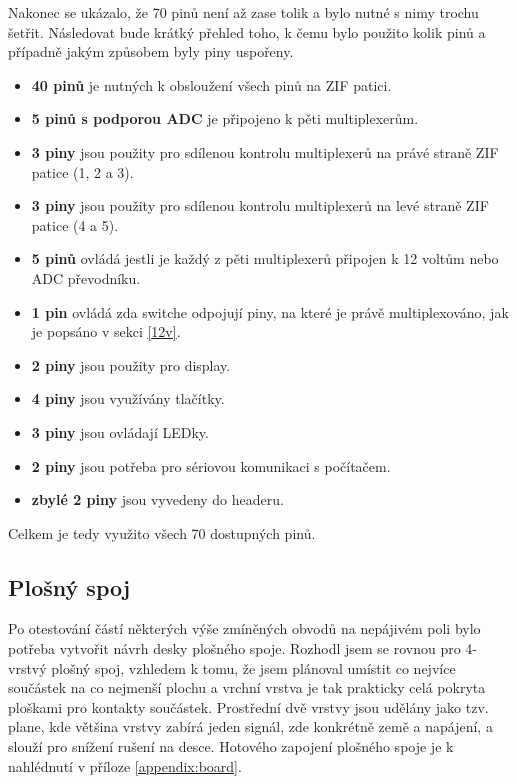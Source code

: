 \documentclass[11pt,a4paper,twoside,openright]{report}
\begin{document}
Nakonec se ukázalo, že 70 pinů není až zase tolik a bylo nutné s nimy trochu šetřit. Následovat bude krátký přehled toho, k čemu bylo použito kolik pinů a případně jakým způsobem byly piny uspořeny.

\begin {itemize}
\item \textbf{40 pinů} je nutných k obsloužení všech pinů na ZIF patici.
\item \textbf{5 pinů s podporou ADC} je připojeno k pěti multiplexerům.
\item \textbf{3 piny} jsou použity pro sdílenou kontrolu multiplexerů na právé straně ZIF patice (1, 2 a 3). \footnotemark{}
\item \textbf{3 piny} jsou použity pro sdílenou kontrolu multiplexerů na levé straně ZIF patice (4 a 5). \footnotemark[\value{footnote}]
\item \textbf{5 pinů} ovládá jestli je každý z pěti multiplexerů připojen k 12 voltům nebo ADC převodníku.
\item \textbf{1 pin} ovládá zda switche odpojují piny, na které je právě multiplexováno, jak je popsáno v sekci \ref{12v}.
\item \textbf{2 piny} jsou použity pro display.
\item \textbf{4 piny} jsou využívány tlačítky.
\item \textbf{3 piny} jsou ovládají LEDky.
\item \textbf{2 piny} jsou potřeba pro sériovou komunikaci s počítačem.
\item \textbf{zbylé 2 piny} jsou vyvedeny do headeru.
\end {itemize}

Celkem je tedy využito všech 70 dostupných pinů.

\subsection {Plošný spoj}

Po otestování částí některých výše zmíněných obvodů na nepájivém poli bylo potřeba vytvořit návrh desky plošného spoje. Rozhodl jsem se rovnou pro 4-vrstvý plošný spoj, vzhledem k tomu, že jsem plánoval umístit co nejvíce součástek na co nejmenší plochu a vrchní vrstva je tak prakticky celá pokryta ploškami pro kontakty součástek. Prostřední dvě vrstvy jsou udělány jako tzv. plane, kde většina vrstvy zabírá jeden signál, zde konkrétně země a napájení, a slouží pro snížení rušení na desce. Hotového zapojení plošného spoje je k nahlédnutí v příloze \ref{appendix:board}.
\end{document}
